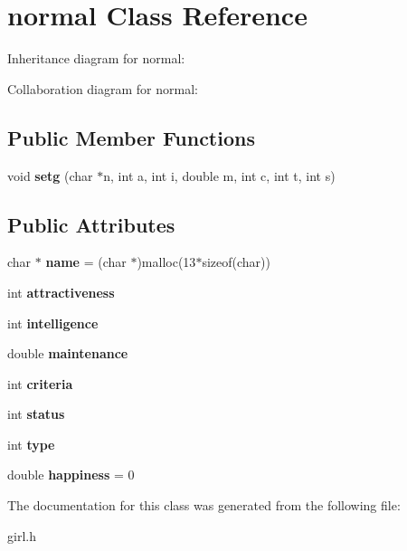 \hypertarget{classnormal}{}\section{normal Class Reference}
\label{classnormal}


Inheritance diagram for normal\+:


Collaboration diagram for normal\+:
\subsection*{Public Member Functions}
\begin{DoxyCompactItemize}
\item 
void {\bfseries setg} (char $\ast$n, int a, int i, double m, int c, int t, int s)\hypertarget{classnormal_a487763000d696292e2c955b286765051}{}\label{classnormal_a487763000d696292e2c955b286765051}

\end{DoxyCompactItemize}
\subsection*{Public Attributes}
\begin{DoxyCompactItemize}
\item 
char $\ast$ {\bfseries name} = (char $\ast$)malloc(13$\ast$sizeof(char))\hypertarget{classnormal_a76e8d0817d4fc81b26f70da2934b297b}{}\label{classnormal_a76e8d0817d4fc81b26f70da2934b297b}

\item 
int {\bfseries attractiveness}\hypertarget{classnormal_abfa1bdc2c7d96961896cf87c617e3af4}{}\label{classnormal_abfa1bdc2c7d96961896cf87c617e3af4}

\item 
int {\bfseries intelligence}\hypertarget{classnormal_ac32f6c480292b1025f6481fd11c83fcb}{}\label{classnormal_ac32f6c480292b1025f6481fd11c83fcb}

\item 
double {\bfseries maintenance}\hypertarget{classnormal_a1395de8ca0cf7a7003cabb6bd216f82d}{}\label{classnormal_a1395de8ca0cf7a7003cabb6bd216f82d}

\item 
int {\bfseries criteria}\hypertarget{classnormal_a87e3479e7eb7f0341d0b874305bb65d8}{}\label{classnormal_a87e3479e7eb7f0341d0b874305bb65d8}

\item 
int {\bfseries status}\hypertarget{classnormal_a7df1d65569b36314224993556c1caaba}{}\label{classnormal_a7df1d65569b36314224993556c1caaba}

\item 
int {\bfseries type}\hypertarget{classnormal_a6e84df201e1a15050bde822fa681dea7}{}\label{classnormal_a6e84df201e1a15050bde822fa681dea7}

\item 
double {\bfseries happiness} = 0\hypertarget{classnormal_a709c8edbbc98214beba75b16b53ccec2}{}\label{classnormal_a709c8edbbc98214beba75b16b53ccec2}

\end{DoxyCompactItemize}


The documentation for this class was generated from the following file\+:\begin{DoxyCompactItemize}
\item 
girl.\+h\end{DoxyCompactItemize}
